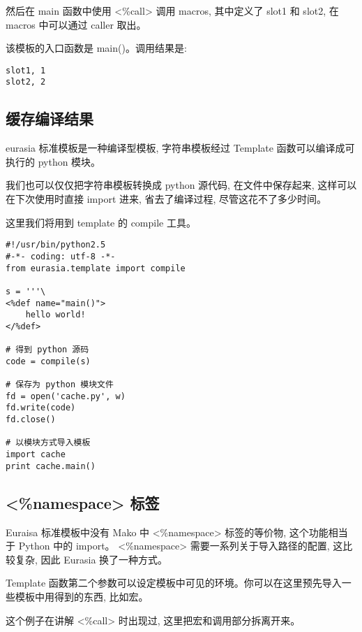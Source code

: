 \documentclass{manual}
\begin{document}
然后在 main 函数中使用 <\%call> 调用 macros, 其中定义了 slot1 和 slot2,
在 macros 中可以通过 caller 取出。

该模板的入口函数是 main()。调用结果是:

\begin{verbatim}
slot1, 1
slot2, 2
\end{verbatim}



\subsection{缓存编译结果}

eurasia 标准模板是一种编译型模板, 字符串模板经过 Template 函数可以编译成可执行的 python 模块。

我们也可以仅仅把字符串模板转换成 python 源代码, 在文件中保存起来,
这样可以在下次使用时直接 import 进来, 省去了编译过程, 尽管这花不了多少时间。

这里我们将用到 template 的 compile 工具。

\begin{verbatim}
#!/usr/bin/python2.5
#-*- coding: utf-8 -*-
from eurasia.template import compile

s = '''\
<%def name="main()">
	hello world!
</%def>

# 得到 python 源码
code = compile(s)

# 保存为 python 模块文件
fd = open('cache.py', w)
fd.write(code)
fd.close()

# 以模块方式导入模板
import cache
print cache.main()
\end{verbatim}

\subsection{<\%namespace> 标签}

Euraisa 标准模板中没有 Mako 中 <\%namespace> 标签的等价物, 这个功能相当于 Python 中的 import。
<\%namespace> 需要一系列关于导入路径的配置, 这比较复杂, 因此 Eurasia 换了一种方式。

Template 函数第二个参数可以设定模板中可见的环境。你可以在这里预先导入一些模板中用得到的东西, 比如宏。

这个例子在讲解 <\%call> 时出现过, 这里把宏和调用部分拆离开来。
\end{document}
